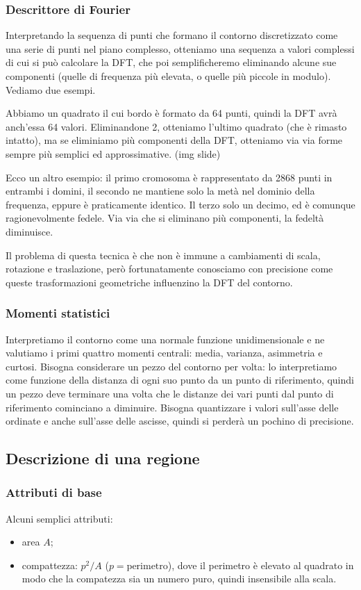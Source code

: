 \documentclass[a4paper,11pt]{article}
\begin{document}
\subsubsection{Descrittore di Fourier}
Interpretando la sequenza di punti che formano il contorno discretizzato come una serie di punti nel piano complesso, otteniamo una sequenza a valori complessi di cui si può
calcolare la DFT, che poi semplificheremo eliminando alcune sue componenti (quelle di frequenza più elevata, o quelle più piccole in modulo). Vediamo due esempi.
\par
Abbiamo un quadrato il cui bordo è formato da 64 punti, quindi la DFT avrà anch'essa 64 valori. Eliminandone 2, otteniamo l'ultimo quadrato (che è rimasto intatto),
ma se eliminiamo più componenti della DFT, otteniamo via via forme sempre più semplici ed approssimative. (img slide)
\par
Ecco un altro esempio: il primo cromosoma è rappresentato da 2868 punti in entrambi i domini, il secondo ne mantiene solo la metà nel dominio della frequenza, eppure è praticamente identico.
Il terzo solo un decimo, ed è comunque ragionevolmente fedele. Via via che si eliminano più componenti, la fedeltà diminuisce.
\par
Il problema di questa tecnica è che non è immune a cambiamenti di scala, rotazione e traslazione, però fortunatamente conosciamo con precisione come queste trasformazioni
geometriche influenzino la DFT del contorno.

\subsubsection{Momenti statistici}
Interpretiamo il contorno come una normale funzione unidimensionale e ne valutiamo i primi quattro momenti centrali: media, varianza, asimmetria e curtosi.
Bisogna considerare un pezzo del contorno per volta: lo interpretiamo come funzione della distanza di ogni suo punto da un punto di riferimento, quindi
un pezzo deve terminare una volta che le distanze dei vari punti dal punto di riferimento cominciano a diminuire.
Bisogna quantizzare i valori sull'asse delle ordinate e anche sull'asse delle ascisse, quindi si perderà un pochino di precisione.

\subsection{Descrizione di una regione}
\subsubsection{Attributi di base}
Alcuni semplici attributi:
\begin{itemize}
    \item area $A$;
    \item compattezza: $p^2/A$ ($p = \text{perimetro}$), dove il perimetro è elevato al quadrato in modo che la compatezza sia un numero puro, quindi insensibile alla scala.
\end{itemize}
\end{document}
